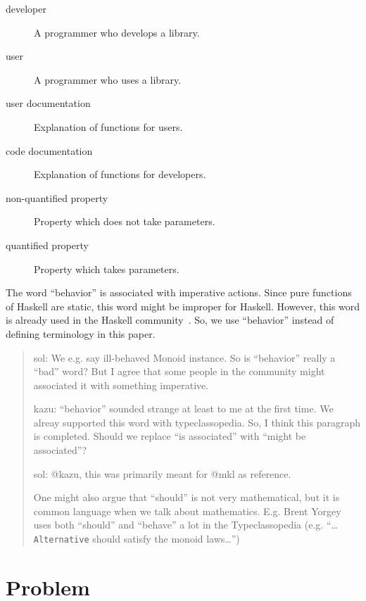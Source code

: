 \documentclass[preprint]{sigplanconf}
\begin{document}
\begin{description}
\item[developer]
    A programmer who develops a library.

\item[user]
    A programmer who uses a library.


\item[user documentation]
    Explanation of functions for users.
\item[code documentation]
    Explanation of functions for developers.

\item[non-quantified property]
    Property which does not take parameters.

\item[quantified property]
    Property which takes parameters.

\end{description}

The word ``behavior'' is associated with imperative actions.  Since
pure functions of Haskell are static, this word might be improper for
Haskell.  However, this word is already used in the Haskell
community~\cite{typeclassopedia}.  So, we use ``behavior'' instead of
defining terminology in this paper.

\begin{quote}
    sol: We e.g. say ill-behaved Monoid instance.  So is
    ``behavior'' really a ``bad'' word?  But I agree that some people in
    the community might associated it with something imperative.

    kazu: ``behavior'' sounded strange at least to me at the first time.
    We alreay supported this word with typeclassopedia. So, I think
    this paragraph is completed. Should we replace ``is associated'' with
    ``might be associated''?

    sol: @kazu, this was primarily meant for @mkl as reference.

    One might also argue that ``should'' is not very mathematical, but
    it is common language when we talk about mathematics.  E.g. Brent
    Yorgey uses both ``should'' and ``behave'' a lot in the
    Typeclassopedia (e.g. ``\ldots {\tt Alternative} should satisfy
    the monoid laws\ldots'')
\end{quote}

\section{Problem}
\label{sec:problem}
\end{document}
